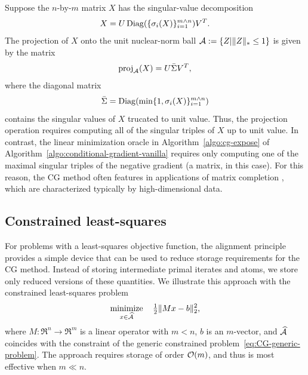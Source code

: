 \begin{example}
  Suppose the $n$-by-$m$ matrix $X$ has the singular-value decomposition
  \[
     X=U\operatorname{Diag}(\{\sigma_i(X)\}_{i=1}^{m\wedge n})V^T.
  \]
  The  projection of $X$ onto the unit nuclear-norm ball
  $\mathcal{A}:=\{Z|\|Z\|_*\le1\}$ is given by the matrix
\begin{equation*}
  \operatorname{proj}_{\mathcal{A}}(X) = U\bar\Sigma V^T,
\end{equation*}
where the diagonal matrix 
\begin{equation*}
  \bar\Sigma = \operatorname{Diag}(\min\{1,\sigma_i(X)\}^{m\wedge n}_{i=1})
\end{equation*}
contains the singular values of $X$ trucated to unit value. Thus, the projection
operation requires computing all of the singular triples of $X$ up to unit
value. In contrast, the linear minimization oracle in Algorithm~\ref{algo:cg-expose} of
Algorithm~\ref{algo:conditional-gradient-vanilla} requires only computing one of the
maximal singular triples of the negative gradient (a matrix, in this case). For
this reason, the CG method often features in applications of matrix completion
\cite{jaggi2010simple,shalev2011large,lee2009efficient}, which are characterized
typically by high-dimensional data.
\end{example}


\subsection{Constrained least-squares}

For problems with a least-squares objective function, the alignment principle
provides a simple device that can be used to reduce storage requirements for the
CG method. Instead of storing intermediate primal iterates and atoms, we store
only reduced versions of these quantities. We illustrate this approach with the
constrained least-squares problem
\begin{equation} \label{eq:CG-least-square}
   \displaystyle\mathop{\hbox{\rm minimize}}_{x\in\widehat{\mathcal{A}}}\enspace\enspace {\textstyle{\frac{1}{2}}}\|Mx - b\|_2^2,
\end{equation}
where $M:\Re^n\to\Re^m$ is a linear operator with $m < n$, $b$ is an $m$-vector,
and $\widehat{\mathcal{A}}$ coincides with the constraint of the generic constrained
problem~\eqref{eq:CG-generic-problem}. The approach requires storage of order
$\mathcal{O}(m)$, and thus is most effective when $m\ll n$.

